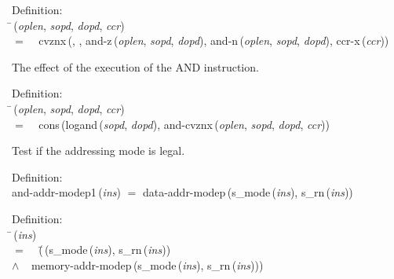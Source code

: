 \begin{tabbing}{\sc Definition}: \\  
\=\,({\it{oplen\/}}, {\it{sopd\/}}, {\it{dopd\/}}, {\it{ccr\/}}) \\ 
$=$$\;\;\;\;${\rm{cvznx}}\,({}, {}, {\rm{and-z}}\,({\it{oplen\/}}, {\it{sopd\/}}, {\it{dopd\/}}), {\rm{and-n}}\,({\it{oplen\/}}, {\it{sopd\/}}, {\it{dopd\/}}), {\rm{ccr-x}}\,({\it{ccr\/}}))\-
\end{tabbing}

 The effect of the execution of the AND instruction.
\begin{tabbing}{\sc Definition}: \\  
\=\,({\it{oplen\/}}, {\it{sopd\/}}, {\it{dopd\/}}, {\it{ccr\/}}) \\ 
$=$$\;\;\;\;${\rm{cons}}\,({\rm{logand}}\,({\it{sopd\/}}, {\it{dopd\/}}), {\rm{and-cvznx}}\,({\it{oplen\/}}, {\it{sopd\/}}, {\it{dopd\/}}, {\it{ccr\/}}))\-
\end{tabbing}

 Test if the addressing mode is legal.
\begin{tabbing}{\sc Definition}: \\  
{\rm{and-addr-modep1}}\,({\it{ins\/}}) $=$ {\rm{data-addr-modep}}\,({\rm{s\_mode}}\,({\it{ins\/}}), {\rm{s\_rn}}\,({\it{ins\/}}))
\end{tabbing}

\begin{tabbing}{\sc Definition}: \\  
\=\,({\it{ins\/}}) \\ 
$=$$\;\;\;\;$(\=\,({\rm{s\_mode}}\,({\it{ins\/}}), {\rm{s\_rn}}\,({\it{ins\/}})) \\ 
$\wedge$$\;\;\;\;${\rm{memory-addr-modep}}\,({\rm{s\_mode}}\,({\it{ins\/}}), {\rm{s\_rn}}\,({\it{ins\/}})))\-\-
\end{tabbing}

